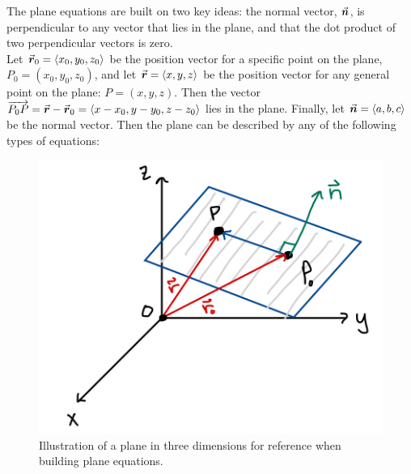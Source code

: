 The plane equations are built on two key ideas: the normal vector, \(\n \), is perpendicular to any vector that lies in the plane, and that the dot product of two perpendicular vectors is zero.\\


Let \(\vec{r}_0 = \<x_0, y_0, z_0\>\) be the position vector for a specific point on the plane, \(P_0  = (x_0, y_0, z_0)\), and let \(\vec{r} = \< x, y, z\>\) be the position vector for any general point on the plane: \(P = ( x, y, z)\). Then the vector \(\overrightarrow{P_0 P} = \r - \r_0 = \< x - x_0, y - y_0, z-z_0\>\) lies in the plane.
Finally, let \(\n = \<a, b, c\>\) be the normal vector.  Then the plane can be described by any of the following types of equations:\\



\begin{figure}[!h]
\centering
\includegraphics[width=\textwidth]{Ch2s5-planes2b.png}
\caption{Illustration of a plane in three dimensions for reference when building plane equations.}
\end{figure}

\hspace*{.2in}





